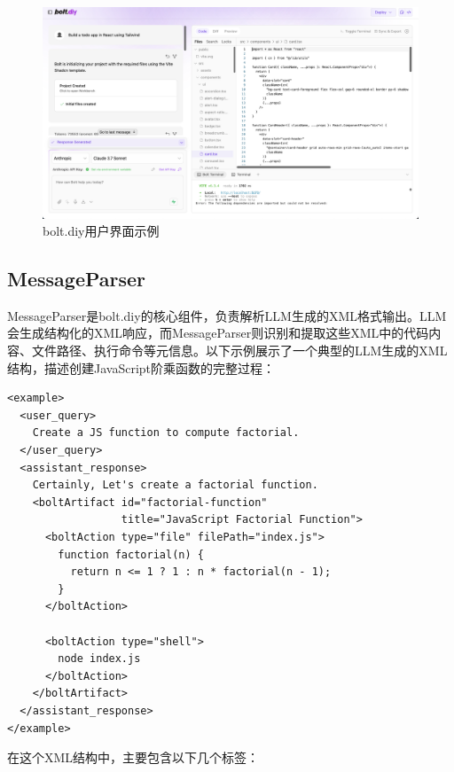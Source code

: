 \begin{figure}
  \centering
  \includegraphics[width=\textwidth]{figures/bolt-diy-example.png}
  \caption{bolt.diy用户界面示例}
  \label{fig:bolt_diy_example}
\end{figure}

\subsection{MessageParser}

MessageParser是bolt.diy的核心组件，负责解析LLM生成的XML格式输出。LLM会生成结构化的XML响应，而MessageParser则识别和提取这些XML中的代码内容、文件路径、执行命令等元信息。以下示例展示了一个典型的LLM生成的XML结构，描述创建JavaScript阶乘函数的完整过程：

\begin{verbatim}
<example>
  <user_query>
    Create a JS function to compute factorial.
  </user_query>
  <assistant_response>
    Certainly, Let's create a factorial function.
    <boltArtifact id="factorial-function" 
                  title="JavaScript Factorial Function">
      <boltAction type="file" filePath="index.js">
        function factorial(n) {
          return n <= 1 ? 1 : n * factorial(n - 1);
        }
      </boltAction>

      <boltAction type="shell">
        node index.js
      </boltAction>
    </boltArtifact>
  </assistant_response>
</example>
\end{verbatim}

在这个XML结构中，主要包含以下几个标签：

